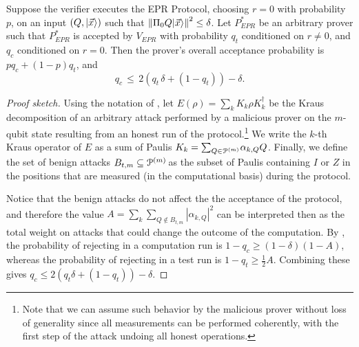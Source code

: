 \begin{theorem}[Soundness]\label{thm:EPR-soundness} 
Suppose the verifier executes the EPR Protocol, choosing $r=0$ with probability~$p$, on an input $(Q,|\vec{x}\rangle)$ such that $\left\|\Pi_0 Q|\vec{x}\rangle\right\|^2\leq \delta$. Let $P_{EPR}^*$ be an arbitrary prover such that $P_{EPR}^*$ is accepted by  $V_{EPR}$ with probability $q_t$ conditioned on $r\neq 0$, and $q_c$ conditioned on $r=0$. Then the prover's overall acceptance probability is $pq_c+(1-p)q_t$, and
$$q_c \,\leq\, 2\left(q_t\,\delta+(1-q_t)\right)-\delta.$$ 
\end{theorem}
\begin{proof}[Proof sketch]
Using the notation of \cite{broadbent15howtoverify}, let $E(\rho) = \sum_{k} K_k \rho K_k^\dagger$ be the Kraus decomposition of an arbitrary attack  performed by a malicious prover on the $m$-qubit state resulting from an honest run of the protocol.\footnote{Note that we can assume such behavior by the malicious prover without loss of generality since  all measurements can be performed coherently, with the first step of the attack undoing all honest operations.}  We write the $k$-th Kraus operator of $E$ as a sum of Paulis $K_k = \sum_{Q\in
  \mathcal{P}^{(m)}\!} \alpha_{k,Q} Q$. Finally, we define the set of benign attacks $B_{t,m} \subseteq \mathcal{P}^{(m)}\!$ as the subset of Paulis containing $I$ or $Z$ in the positions that are measured (in the computational basis) during the protocol.
  
  Notice that the benign attacks do not affect the the acceptance of the protocol, and therefore the value 
$A=\sum_k\sum_{Q 
\not\in
  B_{t,m}}|\alpha_{k,Q}|^2$ can be interpreted then as the total weight on attacks that could change the outcome of the computation. By \cite{broadbent15howtoverify}, the probability of rejecting in a computation run is $1-q_c\geq (1-\delta)(1-A)$, whereas the probability of rejecting in a test run is $1-q_t\geq \frac{1}{2}A$. Combining these gives $q_c\leq 2(q_t\delta+(1-q_t))-\delta$.
\end{proof}


